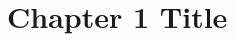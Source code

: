 \graphicspath{ {Images/Chapter1/} }
\cleardoublepage
\chapter{Chapter 1 Title} \label{chap:chap1}





